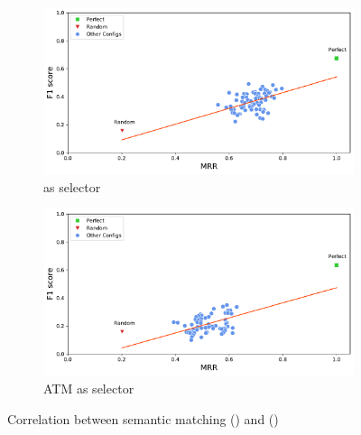\begin{figure}[H]
	\centering
	\begin{subfigure}{.5\textwidth}
		\centering
		\includegraphics[width=1\linewidth]{images/MRR_craftdroid_all_oracle_included.pdf}
		\caption{\craftdroid as selector}
		\label{fig:MRR_craftdroid_all_oracle_full}
	\end{subfigure}%
	\begin{subfigure}{.5\textwidth}
		\centering
		\includegraphics[width=1\linewidth]{images/MRR_atm_atm_oracle_included_passfree.pdf}
		\caption{ ATM as selector}
		\label{fig:MRR_atm_atm_oracle_passfree_full.pdf}
	\end{subfigure}
	\caption{Correlation between semantic matching (\mrr) and \testreuse (\fscore)}
	\label{fig:MRR-F1-scatter}
\end{figure}

